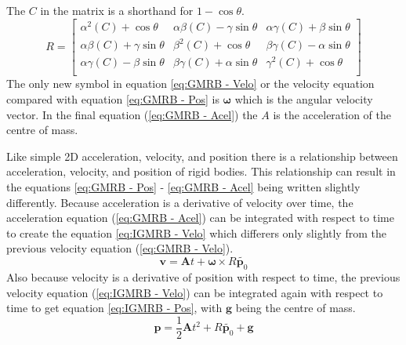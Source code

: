 The $C$ in the matrix is a shorthand for $1-\cos\theta$.
\begin{equation}\label{ma:Rotation}
R = 
\begin{bmatrix}
  {\alpha}^{2}(C) + \cos\theta & 
  \alpha\beta(C) - \gamma\sin\theta & 
  \alpha\gamma(C) + \beta\sin\theta \\
  
  \alpha\beta(C) + \gamma\sin\theta & 
  {\beta}^{2}(C) + \cos\theta & 
  \beta\gamma(C) - \alpha\sin\theta \\
  
  \alpha\gamma(C) - \beta\sin\theta & 
  \beta\gamma(C) + \alpha\sin\theta & 
  {\gamma}^{2}(C) + \cos\theta \\
\end{bmatrix}
\end{equation}
The only new symbol in equation \ref{eq:GMRB - Velo} or the velocity equation compared with equation \ref{eq:GMRB - Pos} is $\boldsymbol{\omega}$ which is the angular velocity vector. In the final equation (\ref{eq:GMRB - Acel}) the $A$ is the acceleration of the centre of mass.

Like simple 2D acceleration, velocity, and position there is a relationship between acceleration, velocity, and position of rigid bodies.
This relationship can result in the equations \ref{eq:GMRB - Pos} - \ref{eq:GMRB - Acel} being written slightly differently.
Because acceleration is a derivative of velocity over time, the acceleration equation (\ref{eq:GMRB - Acel}) can be integrated with respect to time to create the equation \ref{eq:IGMRB - Velo} which differers only slightly from the previous velocity equation (\ref{eq:GMRB - Velo}).
\begin{equation}\label{eq:IGMRB - Velo}
\mathbf{v}=\mathbf{A}t+\boldsymbol\omega\times{R}\tilde{\mathbf{p}_{0}}
\end{equation}
Also because velocity is a derivative of position with respect to time, the previous velocity equation (\ref{eq:IGMRB - Velo}) can be integrated again with respect to time to get equation \ref{eq:IGMRB - Pos}, with $\mathbf{g}$ being the centre of mass.
\begin{equation}\label{eq:IGMRB - Pos}
\mathbf{p}=\frac{1}{2}\mathbf{A}t^{2}+{R}\tilde{\mathbf{p}_{0}}+\mathbf{g}
\end{equation}